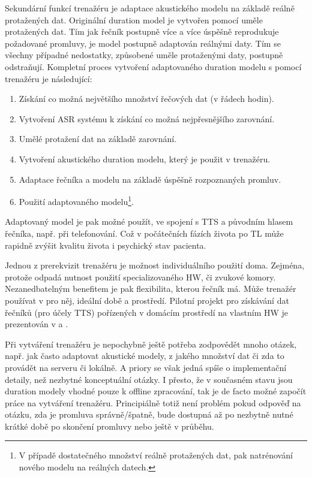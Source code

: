 Sekundární funkcí trenažéru je adaptace akustického modelu na základě reálně protažených dat. Originální duration model je vytvořen pomocí uměle protažených dat. Tím jak řečník postupně více a více úspěšně reprodukuje požadované promluvy, je model postupně adaptován reálnými daty. Tím se všechny případné nedostatky, způsobené uměle protaženými daty, postupně odstraňují. Kompletní proces vytvoření adaptovaného duration modelu s pomocí trenažéru je následující:

\begin{enumerate}
  \item Získání co možná největšího množství řečových dat (v řádech hodin).
  \item Vytvoření ASR systému k získání co možná nejpřesnějšího zarovnání.
  \item Umělé protažení dat na základě zarovnání.
  \item Vytvoření akustického duration modelu, který je použit v trenažéru.
  \item Adaptace řečníka a modelu na základě úspěšně rozpoznaných promluv.
  \item Použití adaptovaného modelu\footnote{V případě dostatečného množství reálně protažených dat, pak natrénování nového modelu na reálných datech.}.
\end{enumerate}

\noindent Adaptovaný model je pak možné použít, ve spojení s TTS a původním hlasem řečníka, např. při telefonování. Což v počátečních fázích života po TL může rapidně zvýšit kvalitu života i psychický stav pacienta. \cite{Mertl2018}

Jednou z prerekvizit trenažéru je možnost individuálního použití doma. Zejména, protože odpadá nutnost použití specializovaného HW, či zvukové komory. Nezanedbatelným benefitem je pak flexibilita, kterou řečník má. Může trenažér používat v pro něj, ideální době a prostředí. Pilotní projekt pro získávání dat řečníků (pro účely TTS) pořízených v domácím prostředí na vlastním HW je prezentován v \cite{Juzova2015} a \cite{Juzova2017}.

Při vytváření trenažéru je nepochybně ještě potřeba zodpovědět mnoho otázek,  např. jak často adaptovat akustické modely, z jakého množství dat či zda to provádět na serveru či lokálně. A priory se však jedná spíše o implementační detaily, než nezbytné konceptuální otázky. I přesto, že v současném stavu jsou duration modely vhodné pouze k offline zpracování, tak je de facto možné započít práce na vytváření trenažéru. Principiálně totiž není problém pokud odpověď na otázku, zda je promluva správně/špatně, bude dostupná až po nezbytně nutné krátké době po skončení promluvy nebo ještě v průběhu.

